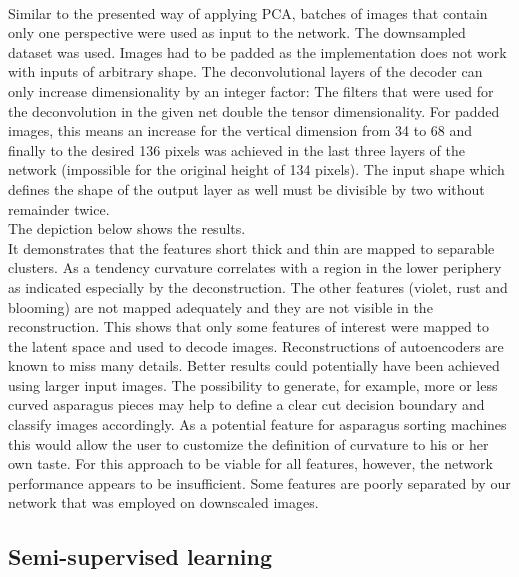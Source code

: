 \\
Similar to the presented way of applying PCA, batches of images that contain only one perspective were used as input to the network. The downsampled dataset was used. Images had to be padded as the implementation does not work with inputs of arbitrary shape. The deconvolutional layers of the decoder can only increase dimensionality by an integer factor: The filters that were used for the deconvolution in the given net double the tensor dimensionality. For padded images, this means an increase for the vertical dimension from 34 to 68 and finally to the desired 136 pixels was achieved in the last three layers of the network (impossible for the original height of 134 pixels). The input shape which defines the shape of the output layer as well must be divisible by two without remainder twice.  \\
The depiction below shows the results. \\


It demonstrates that the features short thick and thin are mapped to separable clusters. As a tendency curvature correlates with a region in the lower periphery as indicated especially by the deconstruction. The other features (violet, rust and blooming) are not mapped adequately and they are not visible in the reconstruction. This shows that only some features of interest were mapped to the latent space and used to decode images. Reconstructions of autoencoders are known to miss many details. Better results could potentially have been achieved using larger input images. The possibility to generate, for example, more or less curved asparagus pieces may help to define a clear cut decision boundary and classify images accordingly. As a potential feature for asparagus sorting machines this would allow the user to customize the definition of curvature to his or her own taste. For this approach to be viable for all features, however, the network performance appears to be insufficient. Some features are poorly separated by our network that was employed on downscaled images.



\subsection{Semi-supervised learning}
\label{sec:SemiSupervisedLearning}


